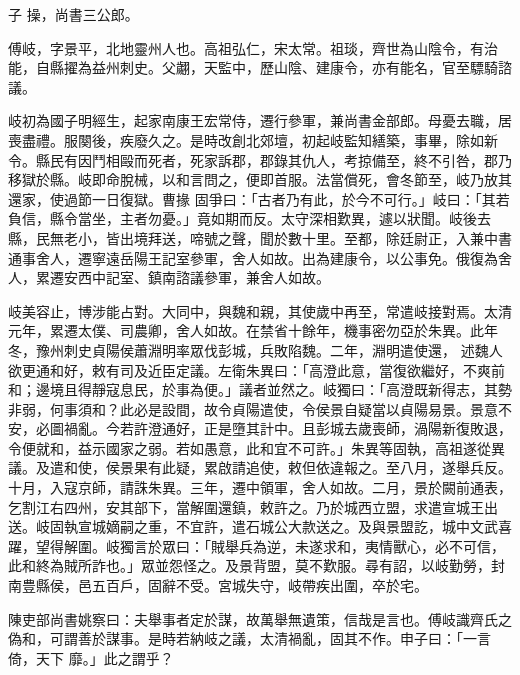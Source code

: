 \begin{pinyinscope}
 子
 操，尚書三公郎。



 傅岐，字景平，北地靈州人也。高祖弘仁，宋太常。祖琰，齊世為山陰令，有治能，自縣擢為益州刺史。父翽，天監中，歷山陰、建康令，亦有能名，官至驃騎諮議。



 岐初為國子明經生，起家南康王宏常侍，遷行參軍，兼尚書金部郎。母憂去職，居喪盡禮。服闋後，疾廢久之。是時改創北郊壇，初起岐監知繕築，事畢，除如新令。縣民有因鬥相毆而死者，死家訴郡，郡錄其仇人，考掠備至，終不引咎，郡乃移獄於縣。岐即命脫械，以和言問之，便即首服。法當償死，會冬節至，岐乃放其還家，使過節一日復獄。曹掾
 固爭曰：「古者乃有此，於今不可行。」岐曰：「其若負信，縣令當坐，主者勿憂。」竟如期而反。太守深相歎異，遽以狀聞。岐後去縣，民無老小，皆出境拜送，啼號之聲，聞於數十里。至都，除廷尉正，入兼中書通事舍人，遷寧遠岳陽王記室參軍，舍人如故。出為建康令，以公事免。俄復為舍人，累遷安西中記室、鎮南諮議參軍，兼舍人如故。



 岐美容止，博涉能占對。大同中，與魏和親，其使歲中再至，常遣岐接對焉。太清元年，累遷太僕、司農卿，舍人如故。在禁省十餘年，機事密勿亞於朱異。此年冬，豫州刺史貞陽侯蕭淵明率眾伐彭城，兵敗陷魏。二年，淵明遣使還，
 述魏人欲更通和好，敕有司及近臣定議。左衛朱異曰：「高澄此意，當復欲繼好，不爽前和；邊境且得靜寇息民，於事為便。」議者並然之。岐獨曰：「高澄既新得志，其勢非弱，何事須和？此必是設間，故令貞陽遣使，令侯景自疑當以貞陽易景。景意不安，必圖禍亂。今若許澄通好，正是墮其計中。且彭城去歲喪師，渦陽新復敗退，令便就和，益示國家之弱。若如愚意，此和宜不可許。」朱異等固執，高祖遂從異議。及遣和使，侯景果有此疑，累啟請追使，敕但依違報之。至八月，遂舉兵反。十月，入寇京師，請誅朱異。三年，遷中領軍，舍人如故。二月，景於闕前通表，
 乞割江右四州，安其部下，當解圍還鎮，敕許之。乃於城西立盟，求遣宣城王出送。岐固執宣城嫡嗣之重，不宜許，遣石城公大款送之。及與景盟訖，城中文武喜躍，望得解圍。岐獨言於眾曰：「賊舉兵為逆，未遂求和，夷情獸心，必不可信，此和終為賊所詐也。」眾並怨怪之。及景背盟，莫不歎服。尋有詔，以岐勤勞，封南豊縣侯，邑五百戶，固辭不受。宮城失守，岐帶疾出圍，卒於宅。



 陳吏部尚書姚察曰：夫舉事者定於謀，故萬舉無遺策，信哉是言也。傅岐識齊氏之偽和，可謂善於謀事。是時若納岐之議，太清禍亂，固其不作。申子曰：「一言倚，天下
 靡。」此之謂乎？



\end{pinyinscope}